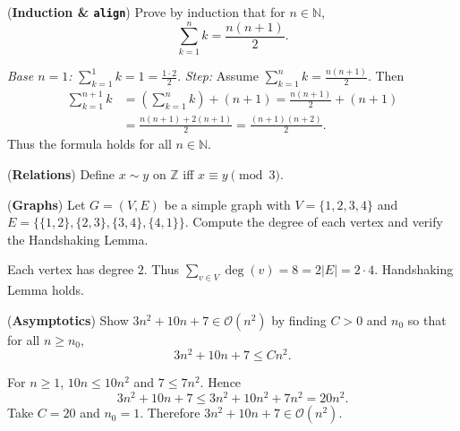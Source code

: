 \documentclass[solutions,answers]{exam}
\providecommand{\N}{\ensuremath{\mathbb{N}}}%
\providecommand{\Z}{\ensuremath{\mathbb{Z}}}%
\providecommand{\Oh}{\ensuremath{\mathcal{O}}}
\begin{document}
\begin{questions}
\question[6]
(\textbf{Induction \& \texttt{align}}) Prove by induction that for $n\in\N$,
\[
\sum_{k=1}^n k = \frac{n(n+1)}{2}.
\]

\begin{solution}
\textit{Base $n=1$:} $\sum_{k=1}^1 k=1=\frac{1\cdot2}{2}$.  
\textit{Step:} Assume $\sum_{k=1}^n k=\frac{n(n+1)}{2}$. Then
\begin{align}
\sum_{k=1}^{n+1} k &= \left(\sum_{k=1}^{n} k\right) + (n+1)
= \frac{n(n+1)}{2} + (n+1) \\
&= \frac{n(n+1)+2(n+1)}{2}
= \frac{(n+1)(n+2)}{2}.
\end{align}
Thus the formula holds for all $n\in\N$.
\end{solution}

\question[6]
(\textbf{Relations}) Define $x\sim y$ on $\Z$ iff $x\equiv y\pmod 3$.

\question[4]
(\textbf{Graphs}) Let $G=(V,E)$ be a simple graph with $V=\{1,2,3,4\}$ and $E=\{\{1,2\},\{2,3\},\{3,4\},\{4,1\}\}$. Compute the degree of each vertex and verify the Handshaking Lemma.

\begin{solution}
Each vertex has degree $2$. Thus $\sum_{v\in V}\deg(v)=8=2|E|=2\cdot4$. Handshaking Lemma holds.
\end{solution}

\question[4]
(\textbf{Asymptotics}) Show $3n^2+10n+7\in \Oh(n^2)$ by finding $C>0$ and $n_0$ so that for all $n\ge n_0$,
\[
3n^2+10n+7 \le C n^2.
\]

\begin{solution}
For $n\ge 1$, $10n\le 10n^2$ and $7\le 7n^2$. Hence
\[
3n^2+10n+7 \le 3n^2+10n^2+7n^2 = 20n^2.
\]
Take $C=20$ and $n_0=1$. Therefore $3n^2+10n+7\in \Oh(n^2)$.
\end{solution}

\end{questions}
\end{document}
